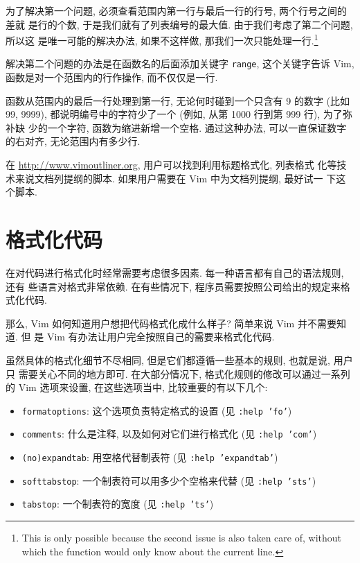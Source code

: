 为了解决第一个问题, 必须查看范围内第一行与最后一行的行号, 两个行号之间的差就
是行的个数, 于是我们就有了列表编号的最大值. 由于我们考虑了第二个问题, 所以这
是唯一可能的解决办法, 如果不这样做, 那我们一次只能处理一行.\footnote{This is
only possible because the second issue is also taken care of, without which
the function would only know about the current line.}

解决第二个问题的办法是在函数名的后面添加关键字 \texttt{range}, 这个关键字告诉
Vim, 函数是对一个范围内的行作操作, 而不仅仅是一行.

函数从范围内的最后一行处理到第一行, 无论何时碰到一个只含有 9 的数字 (比如 99,
9999), 都说明编号中的字符少了一个 (例如, 从第 1000 行到第 999 行), 为了弥补缺
少的一个字符, 函数为缩进新增一个空格. 通过这种办法, 可以一直保证数字的右对齐,
无论范围内有多少行.

\begin{warning}
    在 \url{http://www.vimoutliner.org}, 用户可以找到利用标题格式化, 列表格式
    化等技术来说文档列提纲的脚本. 如果用户需要在 Vim 中为文档列提纲, 最好试一
    下这个脚本.
\end{warning}

\section{格式化代码}
\label{sec:formatting_code}

在对代码进行格式化时经常需要考虑很多因素. 每一种语言都有自己的语法规则, 还有
些语言对格式非常依赖. 在有些情况下, 程序员需要按照公司给出的规定来格式化代码.

那么, Vim 如何知道用户想把代码格式化成什么样子? 简单来说 Vim 并不需要知道. 但
是 Vim 有办法让用户完全按照自己的需要来格式化代码.

虽然具体的格式化细节不尽相同, 但是它们都遵循一些基本的规则, 也就是说, 用户只
需要关心不同的地方即可. 在大部分情况下, 格式化规则的修改可以通过一系列的 Vim
选项来设置, 在这些选项当中, 比较重要的有以下几个:
\begin{itemize}
    \item \texttt{formatoptions}: 这个选项负责特定格式的设置 (见 \texttt{:help
        'fo'})
    \item \texttt{comments}: 什么是注释, 以及如何对它们进行格式化 (见
        \texttt{:help 'com'})
    \item \texttt{(no)expandtab}: 用空格代替制表符 (见 \texttt{:help
        'expandtab'})
    \item \texttt{softtabstop}: 一个制表符可以用多少个空格来代替 (见
        \texttt{:help 'sts'})
    \item \texttt{tabstop}: 一个制表符的宽度 (见 \texttt{:help 'ts'})
\end{itemize}

